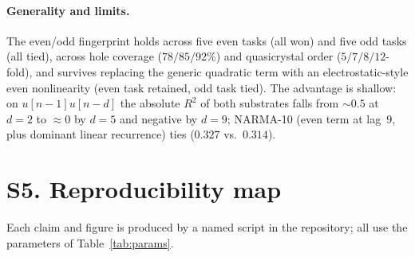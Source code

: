 \documentclass[aps,prapplied,reprint,amsmath,amssymb,floatfix]{revtex4-2}
\begin{document}
\paragraph{Generality and limits.} The even/odd fingerprint holds across five
even tasks (all won) and five odd tasks (all tied), across hole coverage
($78/85/92\%$) and quasicrystal order ($5/7/8/12$-fold), and survives replacing
the generic quadratic term with an electrostatic-style even nonlinearity (even
task retained, odd task tied). The advantage is shallow: on $u[n{-}1]u[n{-}d]$
the absolute $R^2$ of both substrates falls from $\sim\!0.5$ at $d=2$ to
$\approx\!0$ by $d=5$ and negative by $d=9$; NARMA-10 (even term at lag~9, plus
dominant linear recurrence) ties ($0.327$ vs.\ $0.314$).

\section{S5. Reproducibility map}

Each claim and figure is produced by a named script in the repository; all use
the parameters of Table~\ref{tab:params}.
\end{document}

